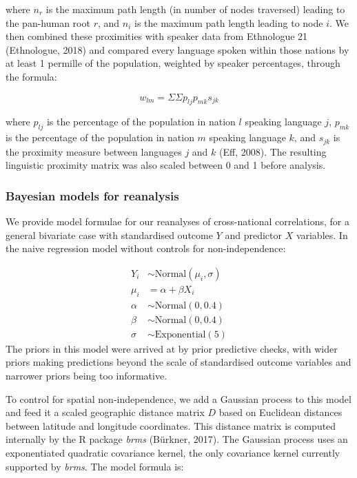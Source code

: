 \documentclass[
  man,floatsintext]{apa6}
\begin{document}
where \(n_{r}\) is the maximum path length (in number of nodes traversed) leading to the pan-human root \(r\), and \(n_{i}\) is the maximum path length leading to node \(i\). We then combined these proximities with speaker data from Ethnologue 21 (Ethnologue, 2018) and compared every language spoken within those nations by at least 1 permille of the population, weighted by speaker percentages, through the formula:

\[
w_{lm} = {\Sigma}{\Sigma}p_{lj}p_{mk}s_{jk}
\]

where \(p_{lj}\) is the percentage of the population in nation \(l\) speaking language \(j\), \(p_{mk}\) is the percentage of the population in nation \(m\) speaking language \(k\), and \(s_{jk}\) is the proximity measure between languages \(j\) and \(k\) (Eff, 2008). The resulting linguistic proximity matrix was also scaled between 0 and 1 before analysis.

\hypertarget{bayesian-models-for-reanalysis}{%
\subsubsection{Bayesian models for reanalysis}\label{bayesian-models-for-reanalysis}}

We provide model formulae for our reanalyses of cross-national correlations, for a general bivariate case with standardised outcome \(Y\) and predictor \(X\) variables. In the naive regression model without controls for non-independence:

\[
\begin{aligned}
Y_{i} &\sim \text{Normal}(\mu_{i},\sigma) \\
\mu_{i} &= \alpha + \beta X_{i} \\
\alpha &\sim \text{Normal}(0, 0.4) \\
\beta &\sim \text{Normal}(0, 0.4) \\
\sigma &\sim \text{Exponential}(5)
\end{aligned}
\]
The priors in this model were arrived at by prior predictive checks, with wider priors making predictions beyond the scale of standardised outcome variables and narrower priors being too informative.

\newpage

To control for spatial non-independence, we add a Gaussian process to this model and feed it a scaled geographic distance matrix \(D\) based on Euclidean distances between latitude and longitude coordinates. This distance matrix is computed internally by the R package \emph{brms} (Bürkner, 2017). The Gaussian process uses an exponentiated quadratic covariance kernel, the only covariance kernel currently supported by \emph{brms}. The model formula is:
\end{document}
